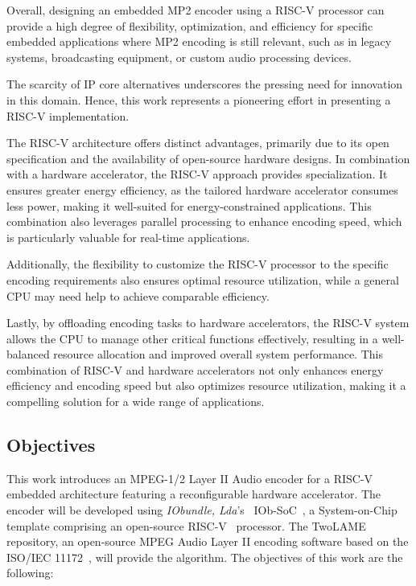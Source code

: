 Overall, designing an embedded MP2 encoder using a RISC-V processor can provide a high degree of flexibility, optimization, and efficiency for specific embedded applications where MP2 encoding is still relevant, such as in legacy systems, broadcasting equipment, or custom audio processing devices.

The scarcity of IP core alternatives underscores the pressing need for innovation in this domain. Hence, this work represents a pioneering effort in presenting a RISC-V implementation.

The RISC-V architecture offers distinct advantages, primarily due to its open specification and the availability of open-source hardware designs. In combination with a hardware accelerator, the RISC-V approach provides specialization. It ensures greater energy efficiency, as the tailored hardware accelerator consumes less power, making it well-suited for energy-constrained applications. This combination also leverages parallel processing to enhance encoding speed, which is particularly valuable for real-time applications.

Additionally, the flexibility to customize the RISC-V processor to the specific encoding requirements also ensures optimal resource utilization, while a general CPU may need help to achieve comparable efficiency.

Lastly, by offloading encoding tasks to hardware accelerators, the RISC-V system allows the CPU to manage other critical functions effectively, resulting in a well-balanced resource allocation and improved overall system performance.  This combination of RISC-V and hardware accelerators not only enhances energy efficiency and encoding speed but also optimizes resource utilization, making it a compelling solution for a wide range of applications.


\subsection{Objectives}

This work introduces an MPEG-1/2 Layer II Audio encoder for a RISC-V embedded architecture
featuring a reconfigurable hardware accelerator. The encoder will be developed using \textit{IObundle, Lda}'s~\cite{iobundle} IOb-SoC~\cite{bib:iobsoc-github}, a System-on-Chip template comprising an open-source RISC-V~\cite{riscv} processor. The TwoLAME~\cite{twolamerepo} repository, an open-source MPEG Audio Layer II encoding software based on the ISO/IEC 11172~\cite{11172}, will provide the algorithm.
The objectives of this work are the following:

